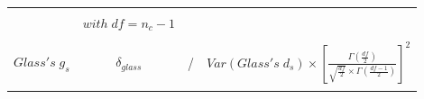 \documentclass[
  man,floatsintext]{apa6}
\begin{document}
\begin{landscape}
\begin{longtable}[]{@{}lccc@{}}
\begin{minipage}[t]{0.48\columnwidth}
\end{minipage}\tabularnewline
\begin{minipage}[t]{0.06\columnwidth}\raggedright
\strut
\end{minipage} & \begin{minipage}[t]{0.15\columnwidth}\centering
\tiny\(with \; df =n_c-1\)\strut
\end{minipage} & \begin{minipage}[t]{0.19\columnwidth}\centering
\strut
\end{minipage} & \begin{minipage}[t]{0.48\columnwidth}\centering
\strut
\end{minipage}\tabularnewline
\begin{minipage}[t]{0.06\columnwidth}\raggedright
\strut
\end{minipage} & \begin{minipage}[t]{0.15\columnwidth}\centering
\strut
\end{minipage} & \begin{minipage}[t]{0.19\columnwidth}\centering
\strut
\end{minipage} & \begin{minipage}[t]{0.48\columnwidth}\centering
\strut
\end{minipage}\tabularnewline
\begin{minipage}[t]{0.06\columnwidth}\raggedright
\tiny\(Glass's \; g_s\)\strut
\end{minipage} & \begin{minipage}[t]{0.15\columnwidth}\centering
\tiny\(\delta_{glass}\)\strut
\end{minipage} & \begin{minipage}[t]{0.19\columnwidth}\centering
/\strut
\end{minipage} & \begin{minipage}[t]{0.48\columnwidth}\centering
\tiny\(Var(Glass's \; d_s) \times \left[\frac{\Gamma(\frac{df}{2})}{\sqrt{\frac{df}{2}} \times \Gamma(\frac{df-1}{2})}\right]^2\)\strut
\end{minipage}\tabularnewline
\begin{minipage}[t]{0.06\columnwidth}\raggedright
\strut
\end{minipage} & \begin{minipage}[t]{0.15\columnwidth}\centering
\strut
\end{minipage} & \begin{minipage}[t]{0.19\columnwidth}\centering
\strut
\end{minipage} & \begin{minipage}[t]{0.48\columnwidth}\centering

\end{minipage}
\end{longtable}
\end{landscape}
\end{document}
